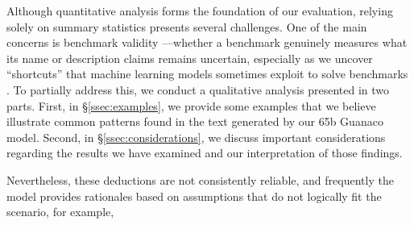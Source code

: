 Although quantitative analysis forms the foundation of our evaluation, relying solely on summary statistics presents several challenges. One of the main concerns is benchmark validity \citep{liao2021we}—whether a benchmark genuinely measures what its name or description claims remains uncertain, especially as we uncover “shortcuts” that machine learning models sometimes exploit to solve benchmarks \citep{gururangan2018annotation, poliak2018hypothesis}. To partially address this, we conduct a qualitative analysis presented in two parts. First, in \S\ref{ssec:examples}, we provide some examples that we believe illustrate common patterns found in the text generated by our 65b {Guanaco} model. Second, in \S\ref{ssec:considerations}, we discuss important considerations regarding the results we have examined and our interpretation of those findings.

Nevertheless, these deductions are not consistently reliable, and frequently the model provides rationales based on assumptions that do not logically fit the scenario, for example,

